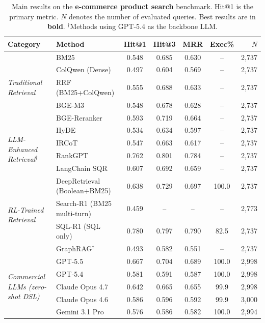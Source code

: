 \documentclass[11pt]{article}
\begin{document}
\begin{table}[t]
\centering
\small
\caption{Main results on the \textbf{e-commerce product search} benchmark. Hit@1 is the primary metric. $N$ denotes the number of evaluated queries. Best results are in \textbf{bold}. $^\dagger$Methods using GPT-5.4 as the backbone LLM.}
\label{tab:main_ecommerce}
\begin{tabular}{llccccr}
\toprule
\textbf{Category} & \textbf{Method} & \textbf{Hit@1} & \textbf{Hit@3} & \textbf{MRR} & \textbf{Exec\%} & \textbf{$N$} \\
\midrule
\multirow{5}{*}{\textit{Traditional Retrieval}}
& BM25 & 0.548 & 0.685 & 0.630 & -- & 2{,}737 \\
& ColQwen (Dense) & 0.497 & 0.604 & 0.569 & -- & 2{,}737 \\
& RRF (BM25+ColQwen) & 0.555 & 0.688 & 0.633 & -- & 2{,}737 \\
& BGE-M3 & 0.548 & 0.678 & 0.628 & -- & 2{,}737 \\
& BGE-Reranker & 0.593 & 0.719 & 0.664 & -- & 2{,}737 \\
\midrule
\multirow{4}{*}{\textit{LLM-Enhanced Retrieval$^\dagger$}}
& HyDE & 0.534 & 0.634 & 0.597 & -- & 2{,}737 \\
& IRCoT & 0.547 & 0.663 & 0.617 & -- & 2{,}737 \\
& RankGPT & 0.762 & 0.801 & 0.784 & -- & 2{,}737 \\
& LangChain SQR & 0.607 & 0.692 & 0.659 & -- & 2{,}737 \\
\midrule
\multirow{4}{*}{\textit{RL-Trained Retrieval}}
& DeepRetrieval (Boolean+BM25) & 0.638 & 0.729 & 0.697 & 100.0 & 2{,}737 \\
& Search-R1 (BM25 multi-turn) & 0.459 & -- & -- & -- & 2{,}773 \\
& SQL-R1 (SQL only) & 0.780 & 0.797 & 0.790 & 82.5 & 2{,}737 \\
& GraphRAG$^\dagger$ & 0.493 & 0.582 & 0.551 & -- & 2{,}737 \\
\midrule
\multirow{5}{*}{\textit{Commercial LLMs (zero-shot DSL)}}
& GPT-5.5 & 0.667 & 0.704 & 0.689 & 100.0 & 2{,}998 \\
& GPT-5.4 & 0.581 & 0.591 & 0.587 & 100.0 & 2{,}998 \\
& Claude Opus 4.7 & 0.642 & 0.665 & 0.655 & 99.9 & 2{,}998 \\
& Claude Opus 4.6 & 0.586 & 0.596 & 0.592 & 99.9 & 3{,}000 \\
& Gemini 3.1 Pro & 0.576 & 0.586 & 0.582 & 100.0 & 2{,}994 \\
\midrule

\end{tabular}
\end{table}
\end{document}

